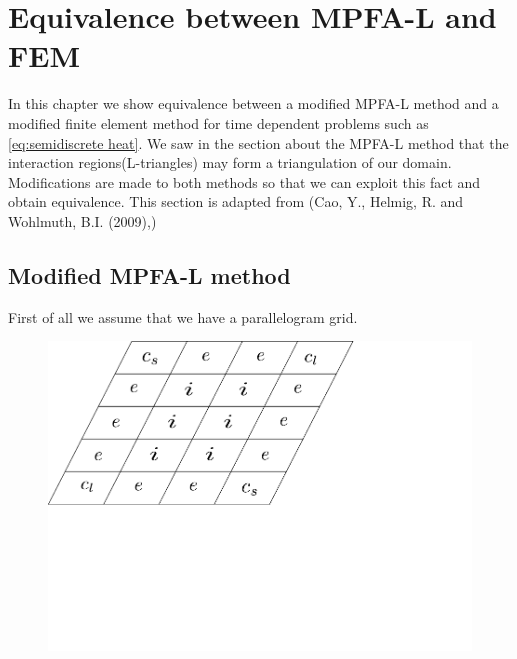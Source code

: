 \documentclass[../Main/main.tex]{subfiles}
\begin{document}
	\chapter{Equivalence between MPFA-L and FEM}
	\graphicspath{{../Equivalence between MPFA-L and FEM/figs/}}
	In this chapter we show equivalence between a modified MPFA-L method and a modified finite element method for time dependent problems such as  \eqref{eq:semidiscrete heat}. 
	We saw in the section about the MPFA-L method that the interaction regions(L-triangles) may form a triangulation of our domain.
	Modifications are made to both methods so that we can exploit this fact and obtain equivalence. This section is adapted from (Cao, Y., Helmig, R. and Wohlmuth, B.I. (2009),\cite{https://doi.org/10.1002/num.20525})
	\section*{Modified MPFA-L method}
	First of all we assume that we have a parallelogram grid.
	\begin{figure}[H]\label{fig:paralellogram mesh}
		\centering
		\includegraphics[width=1\textwidth]{paralellogram_mesh.pdf}
	\end{figure}
	
\end{document}
